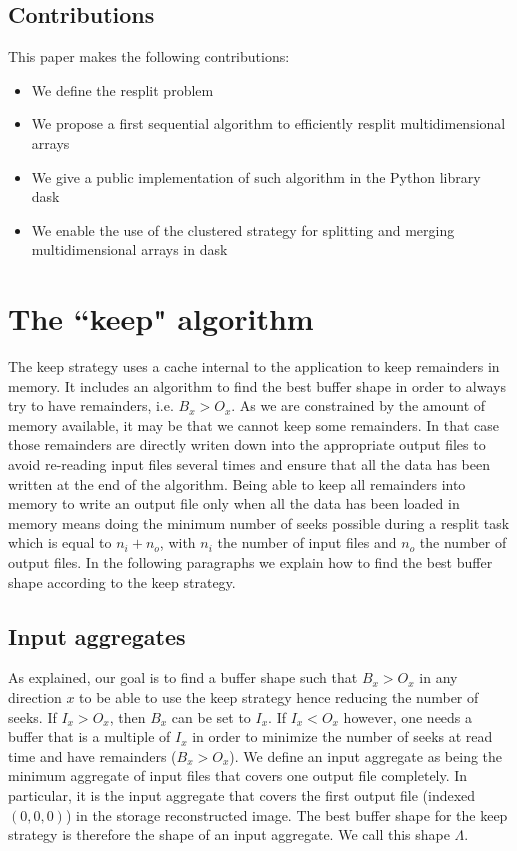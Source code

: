\documentclass[conference]{IEEEtran}
\begin{document}
\subsection{Contributions}
This paper makes the following contributions:
\begin{itemize}
  \item We define the resplit problem
  \item We propose a first sequential algorithm to efficiently resplit
  multidimensional arrays
  \item We give a public implementation of such algorithm in the Python library
  dask
  \item We enable the use of the clustered strategy for splitting and merging
  multidimensional arrays in dask
\end{itemize}

\section{The ``keep" algorithm}
The keep strategy uses a cache internal to the application to keep remainders in
memory. It includes an algorithm to find the best buffer shape in order to
always try to have remainders, i.e. $B_x>O_x$. As we are constrained by the
amount of memory available, it may be that we cannot keep some remainders. In
that case those remainders are directly writen down into the appropriate
output files to avoid re-reading input files several times and ensure that all
the data has been written at the end of the algorithm. Being able to keep all
remainders into memory to write an output file only when all the data has been
loaded in memory means doing the minimum number of seeks possible during a
resplit task which is equal to $n_i + n_o$, with $n_i$ the number of input files
and $n_o$ the number of output files. In the following paragraphs we explain how
to find the best buffer shape according to the keep strategy.

\subsection{Input aggregates}
As explained, our goal is to find a buffer shape such that $B_x>O_x$ in any
direction $x$ to be able to use the keep strategy hence reducing the number of
seeks. If $I_x > O_x$, then $B_x$ can be set to $I_x$. If $I_x < O_x$ however,
one needs a buffer that is a multiple of $I_x$ in order to minimize the number
of seeks at read time and have remainders ($B_x>O_x$). We define an input
aggregate as being the minimum aggregate of input files that covers one output
file completely. In particular, it is the input aggregate that covers the first
output file (indexed $(0,0,0)$) in the storage reconstructed image. The best
buffer shape for the keep strategy is therefore the shape of an input aggregate.
We call this shape $\Lambda$.
\end{document}

